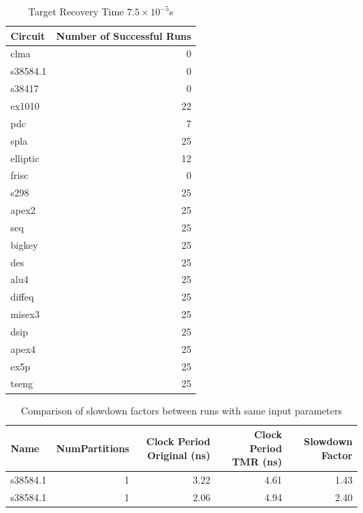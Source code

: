 \documentclass[12pt,final,oneside,a4paper]{dwThesis} %
\begin{document}
      \begin{table}
	\begin{center}
         \begin{tabular}{lr}
            \toprule
 Circuit &  Number of Successful Runs\\
 \midrule
clma  & 0\\
s38584.1  & 0\\
s38417  & 0\\
ex1010  &  22\\
pdc   &  7\\
spla   &  25\\
elliptic &  12\\
frisc  & 0\\
s298  &   25\\
apex2  & 25\\
seq  &   25\\
bigkey  & 25\\
des  &   25\\
alu4  &   25\\
diffeq  & 25\\
misex3  & 25\\
dsip  &   25\\
apex4  & 25\\
ex5p  &   25\\
tseng  & 25\\
            \bottomrule 

         \end{tabular}
         \caption{Target Recovery Time $7.5\times10^{-5}$s} \label{partitionSuccesses}
   \end{center}\end{table}
   \begin{table}
      \begin{center}

      \begin{tabular}
         {lrrrr} \toprule Name & NumPartitions &
         Clock Period Original (ns) & Clock Period TMR (ns) & Slowdown Factor\\
         \midrule
         s38584.1 &	1 & 3.22 & 4.61 & 1.43\\
         s38584.1 &	1 & 2.06 &
         4.94 & 2.40\\
         \bottomrule 
      \end{tabular}
      \caption{Comparison of
         slowdown factors between runs with same input
         parameters}\label{tabStochastic} 
   \end{center}\end{table}
\end{document}
